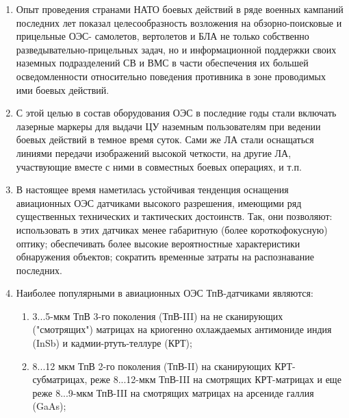 \begin{enumerate}
	\item Опыт проведения странами НАТО боевых действий в ряде военных кампаний последних лет показал целесообразность возложения на обзорно-поисковые и прицельные ОЭС- самолетов, вертолетов и БЛА не только собственно разведывательно-прицельных задач, но и информационной поддержки своих наземных подразделений СВ и ВМС в части обеспечения их большей осведомленности относительно поведения противника в зоне проводимых ими боевых действий.
	\item С этой целью в состав оборудования ОЭС в последние годы стали включать лазерные маркеры для выдачи ЦУ наземным пользователям при ведении боевых действий в темное время суток. Сами же ЛА стали оснащаться линиями передачи изображений высокой четкости, на другие ЛА, участвующие вместе с ними в совместных боевых операциях, и т.п.
	\item В настоящее время наметилась устойчивая тенденция оснащения авиационных ОЭС датчиками высокого разрешения, имеющими ряд существенных технических и тактических достоинств. Так, они позволяют: использовать в этих датчиках менее габаритную (более короткофокусную) оптику; обеспечивать более высокие вероятностные характеристики обнаружения объектов; сократить временные затраты на распознавание последних. 
	\item Наиболее популярными в авиационных ОЭС ТпВ-датчиками являются:
	\begin{enumerate}
		\item 3...5-мкм ТпВ 3-го поколения (ТпВ-III) на не сканирующих ("смотрящих") матрицах на криогенно охлаждаемых антимониде индия (InSb) и кадмии-ртуть-теллуре (КРТ); 
		\item 8...12 мкм ТпВ 2-го поколения (ТпВ-II) на сканирующих КРТ-субматрицах, реже 8...12-мкм ТпВ-III на смотрящих КРТ-матрицах и еще реже 8...9-мкм ТпВ-III на смотрящих матрицах на арсениде галлия (GaAs); 
		 

\end{enumerate}
\end{enumerate}
